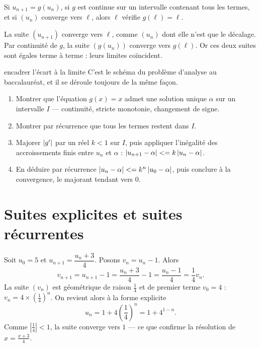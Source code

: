 \begin{theoreme}
Si $u_{n+1} = g(u_{n})$, si $g$ est continue sur un intervalle contenant tous
les termes, et si $(u_{n})$ converge vers $\ell$, alors $\ell$ vérifie
$g(\ell) = \ell$.
\end{theoreme}

\begin{demonstration}
La suite $(u_{n+1})$ converge vers $\ell$, comme $(u_{n})$ dont elle n'est que
le décalage. Par continuité de $g$, la suite $\left(g(u_{n})\right)$ converge
vers $g(\ell)$. Or ces deux suites sont égales terme à terme : leurs limites
coïncident.
\end{demonstration}

\begin{methode}{encadrer l'écart à la limite}
C'est le schéma du problème d'analyse au baccalauréat, et il se déroule
toujours de la même façon.
\begin{enumerate}[label=\textbf{\arabic*.}, leftmargin=*, itemsep=0.15em]
  \item Montrer que l'équation $g(x) = x$ admet une solution unique $\alpha$
        sur un intervalle $I$ — continuité, stricte monotonie, changement de
        signe.
  \item Montrer par récurrence que tous les termes restent dans $I$.
  \item Majorer $\left|g'\right|$ par un réel $k<1$ sur $I$, puis appliquer
        l'inégalité des accroissements finis entre $u_{n}$ et $\alpha$ :
        $\left|u_{n+1}-\alpha\right| <= k\left|u_{n}-\alpha\right|$.
  \item En déduire par récurrence
        $\left|u_{n}-\alpha\right| <= k^{n}\left|u_{0}-\alpha\right|$, puis conclure à la
        convergence, le majorant tendant vers $0$.
\end{enumerate}
\end{methode}

\section{Suites explicites et suites récurrentes}

\begin{exemple}
Soit $u_{0} = 5$ et $u_{n+1} = \dfrac{u_{n}+3}{4}$. Posons
$v_{n} = u_{n}-1$. Alors
\[
  v_{n+1} = u_{n+1}-1 = \frac{u_{n}+3}{4}-1 = \frac{u_{n}-1}{4}
  = \frac14 v_{n}.
\]
La suite $(v_{n})$ est géométrique de raison $\frac14$ et de premier terme
$v_{0} = 4$ : $v_{n} = 4 \times \left(\frac14\right)^{n}$. On revient alors à
la forme explicite
\[
  u_{n} = 1+4\left(\frac14\right)^{n} = 1+4^{1-n}.
\]
Comme $\left|\frac14\right|<1$, la suite converge vers $1$ — ce que
confirme la résolution de $x = \frac{x+3}{4}$.
\end{exemple}

